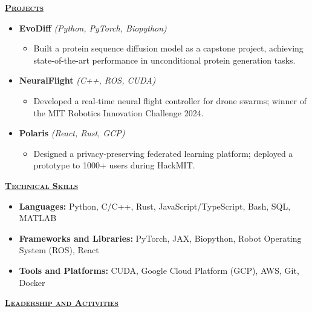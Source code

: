 \documentclass[10pt]{article}
\newcommand{\resumeSection}[1]{\noindent\uline{\textcolor{accentcolor}{\textbf{\textsc{#1}}}\hfill}\par}
\newcommand{\splitEntry}[2]{#1\hfill\textit{#2}}
\begin{document}
  \resumeSection{Projects}

  \begin{itemize}
    \item {
      \splitEntry{\textbf{EvoDiff} \textit{(Python, PyTorch, Biopython)}}{}

      \begin{itemize}
        \item Built a protein sequence diffusion model as a capstone project, achieving state-of-the-art performance in unconditional protein generation tasks.
      \end{itemize}
    }
    \item {
      \splitEntry{\textbf{NeuralFlight} \textit{(C++, ROS, CUDA)}}{}

      \begin{itemize}
        \item Developed a real-time neural flight controller for drone swarms; winner of the MIT Robotics Innovation Challenge 2024.
      \end{itemize}
    }
    \item {
      \splitEntry{\textbf{Polaris} \textit{(React, Rust, GCP)}}{}

      \begin{itemize}
        \item Designed a privacy-preserving federated learning platform; deployed a prototype to 1000+ users during HackMIT.
      \end{itemize}
    }
  \end{itemize}

  \resumeSection{Technical Skills}

  \begin{itemize}[nosep]
    \item \textbf{Languages:} Python, C/C++, Rust, JavaScript/TypeScript, Bash, SQL, MATLAB
    \item \textbf{Frameworks and Libraries:} PyTorch, JAX, Biopython, Robot Operating System (ROS), React
    \item \textbf{Tools and Platforms:} CUDA, Google Cloud Platform (GCP), AWS, Git, Docker
  \end{itemize}

  \resumeSection{Leadership and Activities}
\end{document}
